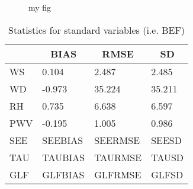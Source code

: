 \documentclass[11pt,english]{article}
\begin{document}
\clearpage
\begin{figure}
\begin{minipage}{.5\linewidth}
\centering
{}
\end{minipage}%
\begin{minipage}{.5\linewidth}
\centering
{}
\end{minipage}\par\medskip
\centering
{}
\caption{my fig}
\label{fig:main}
\end{figure}
\newpage
\begin{table}[]
\begin{center}
\begin{tabular}{|l|l|l|l|}
\hline
                            & \multicolumn{1}{c|}{\cellcolor[HTML]{C0C0C0}\textbf{BIAS}} & \multicolumn{1}{c|}{\cellcolor[HTML]{C0C0C0}\textbf{RMSE}} & \multicolumn{1}{c|}{\cellcolor[HTML]{C0C0C0}\textbf{SD}} \\\hline
\cellcolor[HTML]{C0C0C0}WS  &     0.104                                &     2.487                                &     2.485                                \\
\cellcolor[HTML]{C0C0C0}WD  &    -0.973                                &    35.224                                &    35.211                                \\
\cellcolor[HTML]{C0C0C0}RH  &     0.735                                &     6.638                                &     6.597                                \\
\cellcolor[HTML]{C0C0C0}PWV &    -0.195                               &     1.005                               &     0.986                               \\
\cellcolor[HTML]{C0C0C0}SEE & SEEBIAS                               & SEERMSE                               & SEESD                               \\
\cellcolor[HTML]{C0C0C0}TAU & TAUBIAS                               & TAURMSE                               & TAUSD                               \\
\cellcolor[HTML]{C0C0C0}GLF & GLFBIAS                               & GLFRMSE                               & GLFSD                               \\
\hline
\end{tabular}
\caption{Statistics for standard variables (i.e. BEF)}
\end{center}
\end{table}
\clearpage
\end{document}
